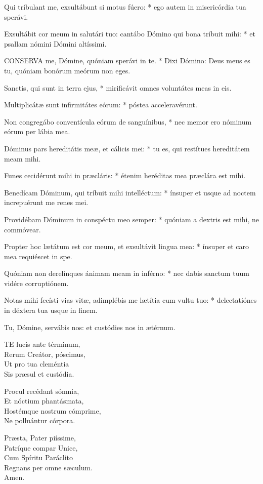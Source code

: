 Qui tríbulant me, exsultábunt si motus fúero: * ego autem in misericórdia tua sperávi.

Exsultábit cor meum in salutári tuo: cantábo Dómino qui bona tríbuit mihi: * et psallam nómini Dómini altíssimi.


\lettrine[lines=2]{C}{ONSERVA} me, Dómine, quóniam sperávi in te. * Dixi Dómino: Deus meus es tu, quóniam bonórum meórum non eges.

Sanctis, qui sunt in terra ejus, * mirificávit omnes voluntátes meas in eis.

Multiplicátæ sunt infirmitátes eórum: * póstea acceleravérunt.

Non congregábo conventícula eórum de sanguínibus, * nec memor ero nóminum eórum per lábia mea.

Dóminus pars hereditátis meæ, et cálicis mei: * tu es, qui restítues hereditátem meam mihi.

Funes cecidérunt mihi in præcláris: * étenim heréditas mea præclára est mihi.

Benedícam Dóminum, qui tríbuit mihi intelléctum: * ínsuper et usque ad noctem increpuérunt me renes mei.

Providébam Dóminum in conspéctu meo semper: * quóniam a dextris est mihi, ne commóvear.

Propter hoc lætátum est cor meum, et exsultávit lingua mea: * ínsuper et caro mea requiéscet in spe.

Quóniam non derelínques ánimam meam in inférno: * nec dabis sanctum tuum vidére corruptiónem.

Notas mihi fecísti vias vitæ, adimplébis me lætítia cum vultu tuo: * delectatiónes in déxtera tua usque in finem.

 Tu, Dómine, servábis nos: et custódies nos in ætérnum.


\lettrine[lines=2]{T}{E} lucis ante términum,\\
Rerum Creátor, póscimus,\\
Ut pro tua cleméntia\\
Sis præsul et custódia.

Procul recédant sómnia,\\
Et nóctium phantásmata,\\
Hostémque nostrum cómprime,\\
Ne polluántur córpora.

Præsta, Pater piíssime,\\
Patríque compar Unice,\\
Cum Spíritu Paráclito\\
Regnans per omne sæculum.\\
Amen.

